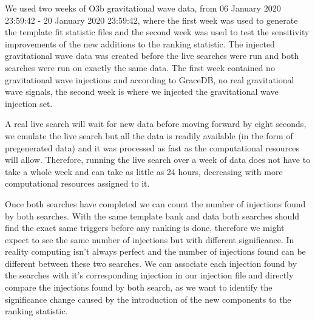 We used two weeks of O3b gravitational wave data, from 06 January 2020 23:59:42 - 20 January 2020 23:59:42, where the first week was used to generate the template fit statistic files and the second week was used to test the sensitivity improvements of the new additions to the ranking statistic. The injected gravitational wave data was created before the live searches were run and both searches were run on exactly the same data. The first week contained no gravitational wave injections and according to GraceDB, no real gravitational wave signals, the second week is where we injected the gravitational wave injection set.

A real live search will wait for new data before moving forward by eight seconds, we emulate the live search but all the data is readily available (in the form of pregenerated data) and it was processed as fast as the computational resources will allow. Therefore, running the live search over a week of data does not have to take a whole week and can take as little as 24 hours, decreasing with more computational resources assigned to it.

Once both searches have completed we can count the number of injections found by both searches. With the same template bank and data both searches should find the exact same triggers before any ranking is done, therefore we might expect to see the same number of injections but with different significance. In reality computing isn't always perfect and the number of injections found can be different between these two searches. We can associate each injection found by the searches with it's corresponding injection in our injection file and directly compare the injections found by both search, as we want to identify the significance change caused by the introduction of the new components to the ranking statistic.

